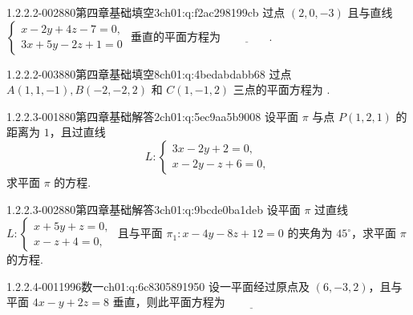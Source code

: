 \begin{q}{1.2.2.2-002}{880第四章基础填空3}{ch01:q:f2ac298199cb}
过点 $(2,0,-3)$ 且与直线 $\begin{cases} x-2y+4z-7=0,\\ 3x+5y-2z+1=0 \end{cases}$ 垂直的平面方程为 $\underline{\hspace{4em}}$.
\end{q}

\begin{q}{1.2.2.2-003}{880第四章基础填空8}{ch01:q:4bedabdabb68}
过点 $A(1,1,-1),B(-2,-2,2)$ 和 $C(1,-1,2)$ 三点的平面方程为 \underline{\hspace{4em}}.
\end{q}

\par\addvspace{2.4ex}\noindent
\begin{minipage}{\linewidth}

\begin{q}{1.2.2.3-001}{880第四章基础解答2}{ch01:q:5ec9aa5b9008}
设平面 $\pi$ 与点 $P(1,2,1)$ 的距离为 $1$，且过直线 \[L:\begin{cases}3x-2y+2=0,\\ x-2y-z+6=0,\end{cases}\] 求平面 $\pi$ 的方程.
\end{q}
\end{minipage}


\begin{q}{1.2.2.3-002}{880第四章基础解答3}{ch01:q:9bcde0ba1deb}
设平面 $\pi$ 过直线 $L:\begin{cases} x+5y+z=0, \\ x-z+4=0, \end{cases}$ 且与平面 $\pi_1:x-4y-8z+12=0$ 的夹角为 $45^\circ$，求平面 $\pi$ 的方程.
\end{q}

\par\addvspace{2.4ex}\noindent
\begin{minipage}{\linewidth}

\begin{q}{1.2.2.4-001}{1996数一}{ch01:q:6c8305891950}
设一平面经过原点及 $(6,-3,2)$，且与平面 $4x-y+2z=8$ 垂直，则此平面方程为 $\underline{\hspace{4em}}$
\end{q}
\end{minipage}


